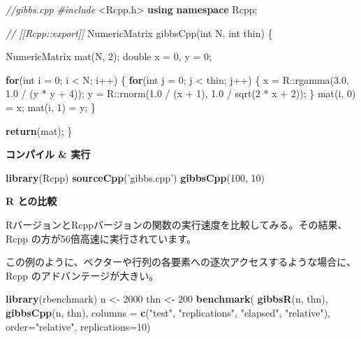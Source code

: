 \documentclass[]{book}
\newenvironment{Shaded}{\begin{snugshade}}{\end{snugshade}}
\newcommand{\CommentTok}[1]{\textcolor[rgb]{0.56,0.35,0.01}{\textit{#1}}}
\newcommand{\ControlFlowTok}[1]{\textcolor[rgb]{0.13,0.29,0.53}{\textbf{#1}}}
\newcommand{\DataTypeTok}[1]{\textcolor[rgb]{0.13,0.29,0.53}{#1}}
\newcommand{\DecValTok}[1]{\textcolor[rgb]{0.00,0.00,0.81}{#1}}
\newcommand{\FloatTok}[1]{\textcolor[rgb]{0.00,0.00,0.81}{#1}}
\newcommand{\ImportTok}[1]{#1}
\newcommand{\KeywordTok}[1]{\textcolor[rgb]{0.13,0.29,0.53}{\textbf{#1}}}
\newcommand{\NormalTok}[1]{#1}
\newcommand{\PreprocessorTok}[1]{\textcolor[rgb]{0.56,0.35,0.01}{\textit{#1}}}
\newcommand{\StringTok}[1]{\textcolor[rgb]{0.31,0.60,0.02}{#1}}
\begin{document}
\begin{Shaded}
\begin{Highlighting}[]
\CommentTok{//gibbs.cpp}
\PreprocessorTok{#include }\ImportTok{<Rcpp.h>}
\KeywordTok{using} \KeywordTok{namespace}\NormalTok{ Rcpp;}

\CommentTok{// [[Rcpp::export]]}
\NormalTok{NumericMatrix gibbsCpp(}\DataTypeTok{int}\NormalTok{ N, }\DataTypeTok{int}\NormalTok{ thin) \{}

\NormalTok{  NumericMatrix mat(N, }\DecValTok{2}\NormalTok{);}
  \DataTypeTok{double}\NormalTok{ x = }\DecValTok{0}\NormalTok{, y = }\DecValTok{0}\NormalTok{;}

  \ControlFlowTok{for}\NormalTok{(}\DataTypeTok{int}\NormalTok{ i = }\DecValTok{0}\NormalTok{; i < N; i++) \{}
    \ControlFlowTok{for}\NormalTok{(}\DataTypeTok{int}\NormalTok{ j = }\DecValTok{0}\NormalTok{; j < thin; j++) \{}
\NormalTok{      x = R::rgamma(}\FloatTok{3.0}\NormalTok{, }\FloatTok{1.0}\NormalTok{ / (y * y + }\DecValTok{4}\NormalTok{));}
\NormalTok{      y = R::rnorm(}\FloatTok{1.0}\NormalTok{ / (x + }\DecValTok{1}\NormalTok{), }\FloatTok{1.0}\NormalTok{ / sqrt(}\DecValTok{2}\NormalTok{ * x + }\DecValTok{2}\NormalTok{));}
\NormalTok{    \}}
\NormalTok{    mat(i, }\DecValTok{0}\NormalTok{) = x;}
\NormalTok{    mat(i, }\DecValTok{1}\NormalTok{) = y;}
\NormalTok{  \}}

  \ControlFlowTok{return}\NormalTok{(mat);}
\NormalTok{\}}
\end{Highlighting}
\end{Shaded}

\textbf{コンパイル \& 実行}

\begin{Shaded}
\begin{Highlighting}[]
\KeywordTok{library}\NormalTok{(Rcpp)}
\KeywordTok{sourceCpp}\NormalTok{(}\StringTok{'gibbs.cpp'}\NormalTok{)}
\KeywordTok{gibbsCpp}\NormalTok{(}\DecValTok{100}\NormalTok{, }\DecValTok{10}\NormalTok{)}
\end{Highlighting}
\end{Shaded}

\textbf{R との比較}

RバージョンとRcppバージョンの関数の実行速度を比較してみる。その結果、Rcpp の方が56倍高速に実行されています。

この例のように、ベクターや行列の各要素への逐次アクセスするような場合に、Rcpp のアドバンテージが大きい。

\begin{Shaded}
\begin{Highlighting}[]
\KeywordTok{library}\NormalTok{(rbenchmark)}
\NormalTok{n <-}\StringTok{ }\DecValTok{2000}
\NormalTok{thn <-}\StringTok{ }\DecValTok{200}
\KeywordTok{benchmark}\NormalTok{( }\KeywordTok{gibbsR}\NormalTok{(n, thn),}
           \KeywordTok{gibbsCpp}\NormalTok{(n, thn),}
           \DataTypeTok{columns =} \KeywordTok{c}\NormalTok{(}\StringTok{"test"}\NormalTok{, }\StringTok{"replications"}\NormalTok{, }\StringTok{"elapsed"}\NormalTok{, }\StringTok{"relative"}\NormalTok{),}
           \DataTypeTok{order=}\StringTok{"relative"}\NormalTok{,}
           \DataTypeTok{replications=}\DecValTok{10}\NormalTok{)}
\end{Highlighting}
\end{Shaded}
\end{document}
